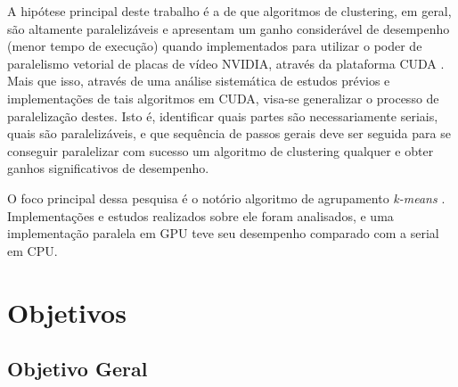 \documentclass[12pt,
openright, 
oneside, %
a4paper,    %
brazil]{facom-ufu-abntex2}
\begin{document}
A hipótese principal deste trabalho é a de que algoritmos de clustering, em geral, são altamente paralelizáveis e apresentam um ganho considerável de desempenho (menor tempo de execução) quando implementados para utilizar o poder de paralelismo vetorial de placas de vídeo NVIDIA, através da plataforma CUDA \cite{CUDAZone}. Mais que isso, através de uma análise sistemática de estudos prévios e implementações de tais algoritmos em CUDA, visa-se generalizar o processo de paralelização destes. Isto é, identificar quais partes são necessariamente seriais, quais são paralelizáveis, e que sequência de passos gerais deve ser seguida para se conseguir paralelizar com sucesso um algoritmo de clustering qualquer e obter ganhos significativos de desempenho.


O foco principal dessa pesquisa é o notório algoritmo de agrupamento \textit{k-means} \cite{kMeansCoinedMacQueen1967} \cite{kMeansFirstAlgoLloyd1982} \cite{GPU-accelerated-K-Means}. Implementações e estudos realizados sobre ele foram analisados, e uma implementação paralela em GPU teve seu desempenho comparado com a serial em CPU.







\section{Objetivos}




\subsection{Objetivo Geral}
\end{document}

